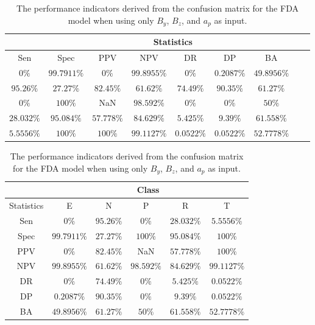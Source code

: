 \begin{table}[!ht]
	\centering
	\begin{tabular}{|c|c|c|c|c|c|c|c|c|}
		\hline
		 & \multicolumn{7}{c|}{Statistics} \\ \hline
		Sen & Spec & PPV & NPV & DR & DP & BA \\ \hline
		$0\%$ & $99.7911\%$ & $0\%$ & $99.8955\%$ & $0\%$ & $0.2087\%$ & $49.8956\%$ \\ \hline
		$95.26\%$ & $27.27\%$ & $82.45\%$ & $61.62\%$ & $74.49\%$ & $90.35\%$ & $61.27\%$ \\ \hline
		$0\%$ & $100\%$ & NaN & $98.592\%$ & $0\%$ & $0\%$ & $50\%$ \\ \hline
		$28.032\%$ & $95.084\%$ & $57.778\%$ & $84.629\%$ & $5.425\%$ & $9.39\%$ & $61.558\%$ \\ \hline
		$5.5556\%$ & $100\%$ & $100\%$ & $99.1127\%$ & $0.0522\%$ & $0.0522\%$ & $52.7778\%$ \\ \hline
	\end{tabular}
	\caption{The performance indicators derived from the confusion matrix for the FDA model when using only $B_{y}$, $B_{z}$, and $a_{p}$ as input.}
	\label{tab:cs:yzap:fda}
\end{table}

\begin{table}[!ht]
	\centering
	\begin{tabular}{|c|c|c|c|c|c|}
		\hline
		 & \multicolumn{5}{c|}{Class} \\ \hline
		Statistics & E & N & P & R & T \\ \hline
		Sen & $0\%$ & $95.26\%$ & $0\%$ & $28.032\%$ & $5.5556\%$ \\ \hline
		Spec & $99.7911\%$ & $27.27\%$ & $100\%$ & $95.084\%$ & $100\%$ \\ \hline
		PPV & $0\%$ & $82.45\%$ & NaN & $57.778\%$ & $100\%$ \\ \hline
		NPV & $99.8955\%$ & $61.62\%$ & $98.592\%$ & $84.629\%$ & $99.1127\%$ \\ \hline
		DR & $0\%$ & $74.49\%$ & $0\%$ & $5.425\%$ & $0.0522\%$ \\ \hline
		DP & $0.2087\%$ & $90.35\%$ & $0\%$ & $9.39\%$ & $0.0522\%$ \\ \hline
		BA & $49.8956\%$ & $61.27\%$ & $50\%$ & $61.558\%$ & $52.7778\%$ \\ \hline
	\end{tabular}
	\caption{The performance indicators derived from the confusion matrix for the FDA model when using only $B_{y}$, $B_{z}$, and $a_{p}$ as input.}
	\label{tab:cs:reverse:yzap:fda}
\end{table}
